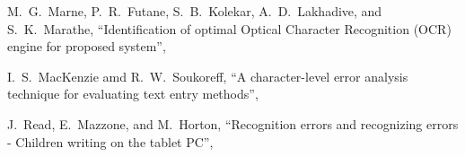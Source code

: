 \documentclass[uplatex, twocolumn,10pt]{jsarticle}
\begin{document}
\begin{thebibliography}{99}
    M.~G.~Marne, P.~R.~Futane, S.~B.~Kolekar, A.~D.~Lakhadive, and S.~K.~Marathe,
    \newblock “Identification of optimal Optical Character Recognition (OCR) engine for proposed system”,
    
    I.~S.~MacKenzie amd R.~W.~Soukoreff, 
    \newblock “A character-level error analysis technique for evaluating text entry methods”,
    
    J.~Read, E.~Mazzone, and M.~Horton,
    \newblock “Recognition errors and recognizing errors - Children writing on the tablet PC”,
    
\end{thebibliography}
\end{document}
